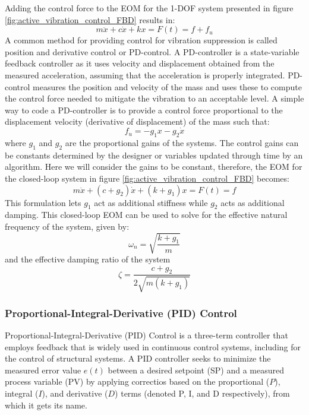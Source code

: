 \documentclass[12pt,letter]{article}
\numberwithin{ex}{section} %
\numberwithin{re}{section} %
\numberwithin{vcs}{section} %
\begin{document}
Adding the control force to the EOM for the 1-DOF system presented in figure \ref{fig:active_vibration_control_FBD} results in:
\begin{equation}
m \ddot{x} + c \dot{x} + kx = F(t) = f + f_u
\end{equation}
A common method for providing control for vibration suppression is called position and derivative control or PD-control. A PD-controller is a state-variable feedback controller as it uses velocity and displacement obtained from the measured acceleration, assuming that the acceleration is properly integrated. PD-control measures the position and velocity of the mass and uses these to compute the control force needed to mitigate the vibration to an acceptable level. A simple way to code a PD-controller is to provide a control force proportional to the displacement velocity (derivative of displacement) of the mass such that:
\begin{equation}
f_u = -g_1x - g_2 \dot{x}
\end{equation}
where $g_1$ and $g_2$ are the proportional gains of the systems. The control gains can be constants determined by the designer or variables updated through time by an algorithm. Here we will consider the gains to be constant, therefore, the EOM for the closed-loop system in figure \ref{fig:active_vibration_control_FBD} becomes:
\begin{equation}
m \ddot{x} + (c + g_2) \dot{x} + (k + g_1)x = F(t) = f 
\end{equation}
This formulation lets $g_1$ act as additional stiffness while $g_2$ acts as additional damping. This closed-loop EOM can be used to solve for the effective natural frequency of the system, given by:
\begin{equation}
\omega_n = \sqrt{\frac{k+g_1}{m}}
\end{equation}
and the effective damping ratio of the system
\begin{equation}
\zeta = \frac{c+g_2}{2\sqrt{m(k+g_1)}}
\end{equation}


\subsubsection{Proportional-Integral-Derivative (PID) Control}

Proportional-Integral-Derivative (PID) Control is a three-term controller that employs feedback that is widely used in continuous control systems, including for the control of structural systems. A PID controller seeks to minimize the measured error value $e(t)$ between a desired setpoint (SP) and a measured process variable (PV) by applying correctios based on the proportional ($P$), integral ($I$), and derivative ($D$) terms (denoted P, I, and D respectively), from which it gets its name.
\end{document}
